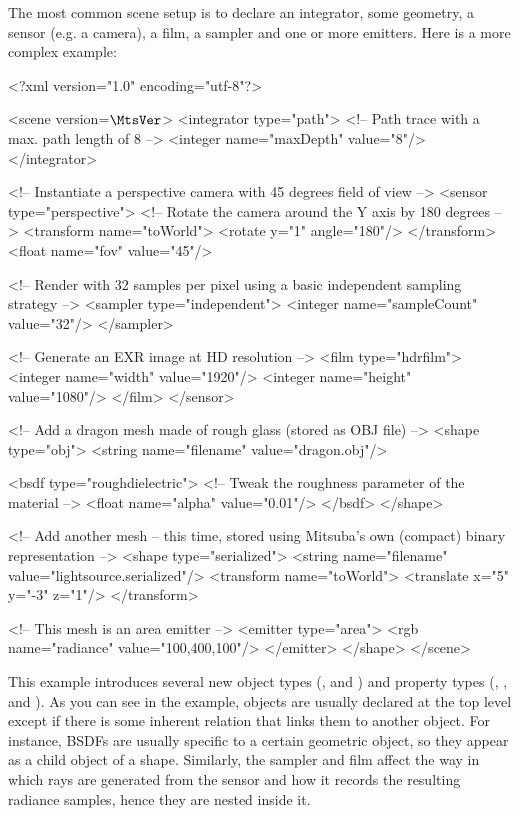 The most common scene setup is to declare an integrator, some geometry, a sensor (e.g. a camera), a film, a sampler
and one or more emitters. Here is a more complex example:
\begin{xml}
<?xml version="1.0" encoding="utf-8"?>

<scene version=$\MtsVer$>
    <integrator type="path">
        <!-- Path trace with a max. path length of 8 -->
        <integer name="maxDepth" value="8"/>
    </integrator>

    <!-- Instantiate a perspective camera with 45 degrees field of view -->
    <sensor type="perspective">
        <!-- Rotate the camera around the Y axis by 180 degrees -->
        <transform name="toWorld">
            <rotate y="1" angle="180"/>
        </transform>
        <float name="fov" value="45"/>

        <!-- Render with 32 samples per pixel using a basic
             independent sampling strategy -->
        <sampler type="independent">
            <integer name="sampleCount" value="32"/>
        </sampler>

        <!-- Generate an EXR image at HD resolution -->
        <film type="hdrfilm">
            <integer name="width" value="1920"/>
            <integer name="height" value="1080"/>
        </film>
    </sensor>

    <!-- Add a dragon mesh made of rough glass (stored as OBJ file) -->
    <shape type="obj">
        <string name="filename" value="dragon.obj"/>

        <bsdf type="roughdielectric">
            <!-- Tweak the roughness parameter of the material -->
            <float name="alpha" value="0.01"/>
        </bsdf>
    </shape>

    <!-- Add another mesh -- this time, stored using Mitsuba's own
         (compact) binary representation -->
    <shape type="serialized">
        <string name="filename" value="lightsource.serialized"/>
        <transform name="toWorld">
            <translate x="5" y="-3" z="1"/>
        </transform>

        <!-- This mesh is an area emitter -->
        <emitter type="area">
            <rgb name="radiance" value="100,400,100"/>
        </emitter>
    </shape>
</scene>
\end{xml}
This example introduces several new object types (, and )
and property types (, , and ).
As you can see in the example, objects are usually declared at the top level except if there is some
inherent relation that links them to another object. For instance, BSDFs are usually specific to a certain geometric object, so
they appear as a child object of a shape. Similarly, the sampler and film affect the way in which
rays are generated from the sensor and how it records the resulting radiance samples, hence they are nested inside it.

